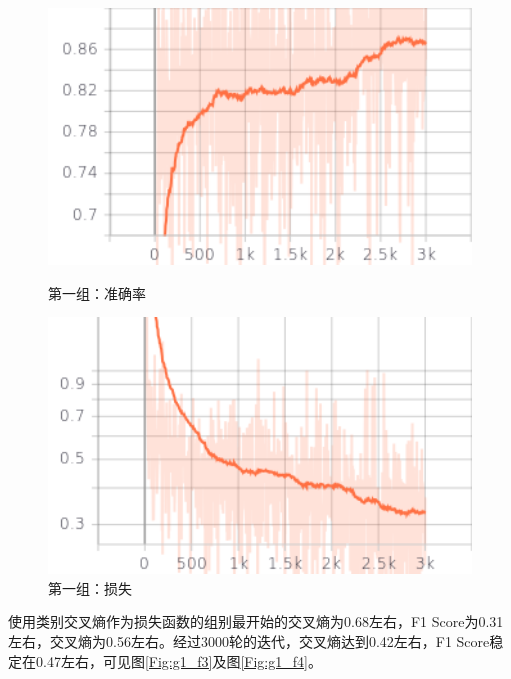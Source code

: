 \begin{figure}[htbp]
    
    \centering
    \begin{minipage}[t]{0.49\textwidth}
        \centering
        \includegraphics[width=1\textwidth]{Figures/图表/交叉熵/accuracy.png}
        \caption{第一组：准确率}
        \label{Fig:g1_f1}
    \end{minipage}
    \begin{minipage}[t]{0.49\textwidth}
        \centering
        \includegraphics[width=1\textwidth]{Figures/图表/交叉熵/cost.png}
        \caption{第一组：损失}
        \label{Fig:g1_f2}
    \end{minipage}
    
\end{figure}

使用类别交叉熵作为损失函数的组别最开始的交叉熵为0.68左右，F1 Score为0.31左右，交叉熵为0.56左右。经过3000轮的迭代，交叉熵达到0.42左右，F1 Score稳定在0.47左右，可见图\ref{Fig:g1_f3}及图\ref{Fig:g1_f4}。

